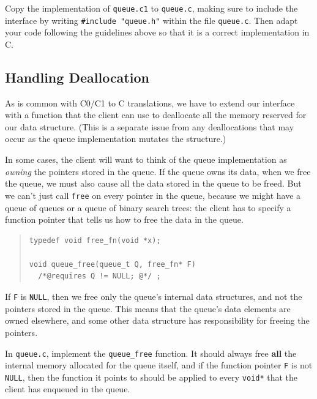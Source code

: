 \documentclass[12pt]{exam}
\begin{document}
\begin{task}[6]
  Copy the implementation of \lstinline'queue.c1' to
  \lstinline'queue.c', making sure to include the interface by writing
  \lstinline'#include "queue.h"' within the file
  \lstinline'queue.c'. Then adapt your code following the guidelines
  above so that it is a correct implementation in C.
\end{task}


\subsection*{Handling Deallocation}

As is common with C0/C1 to C translations, we have to extend our
interface with a function that the client can use to deallocate all
the memory reserved for our data structure. (This is a separate issue
from any deallocations that may occur as the queue implementation
mutates the structure.)

In some cases, the client will want to think of the queue
implementation as \emph{owning} the pointers stored in the queue. If
the queue owns its data, when we free the queue, we must also cause
all the data stored in the queue to be freed. But we can't just call
\lstinline'free' on every pointer in the queue, because we might have a
queue of queues or a queue of binary search trees: the client has to
specify a function pointer that tells us how to free the data in the
queue.

\begin{quote}
\begin{lstlisting}[numbers=none]
typedef void free_fn(void *x);

void queue_free(queue_t Q, free_fn* F)
  /*@requires Q != NULL; @*/ ;
\end{lstlisting}
\end{quote}


If \lstinline'F' is \lstinline'NULL', then we free only the queue's
internal data structures, and not the pointers stored in the
queue. This means that the queue's data elements are owned elsewhere,
and some other data structure has responsibility for freeing the
pointers.


\begin{task}[3]
  In \lstinline'queue.c', implement the \lstinline'queue_free'
  function. It should always free \textbf{all} the internal memory
  allocated for the queue itself, and if the function pointer
  \lstinline'F' is not \lstinline'NULL', then the function it points
  to should be applied to every \lstinline'void*' that the client has
  enqueued in the queue.
\end{task}
\end{document}
